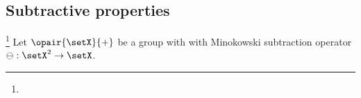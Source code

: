 \subsection{Subtractive properties}
\begin{theorem}
\label{thm:mph_sub}
\footnote{
  }
Let $\opair{\setX}{+}$ be a group with with Minokowski subtraction operator $\ominus:\setX^2\to\setX$.
\end{theorem}
